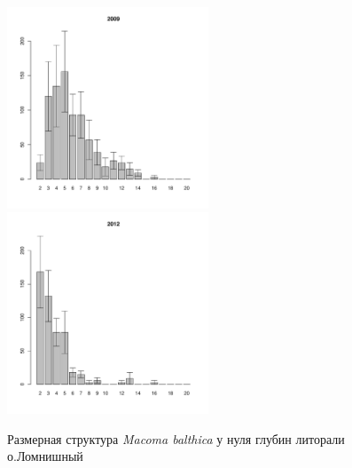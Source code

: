 \documentclass[12pt, a4paper]{article}
\begin{document}
\begin{figure}[h]

\begin{multicols}{2}
\hfill
\includegraphics[width=60mm]{../White_Sea/Lomnishniy/Lomnishniy2_2009_.pdf}
\hfill
\includegraphics[width=60mm]{../White_Sea/Lomnishniy/Lomnishniy2_2012_.pdf}
\end{multicols}



\caption{Размерная структура {\it Macoma balthica} у нуля глубин литорали о.Ломнишный}
\label{ris:size_str_Lomnishniy}
\end{figure}
\end{document}
